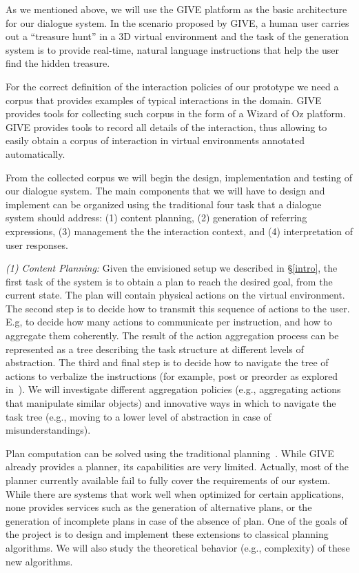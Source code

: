 As we mentioned above, we will use the GIVE platform as the basic architecture 
for our dialogue system.  In the scenario proposed by GIVE, a
human user carries out a ``treasure hunt'' in a 3D virtual environment
and the task of the generation system is to provide real-time, natural
language instructions that help the user find the hidden treasure.

For the correct definition of the interaction policies of our prototype we need
a corpus that provides examples of typical interactions in the domain. GIVE
provides tools for collecting such corpus in the form of a Wizard of Oz
platform. GIVE provides tools to record all details of the interaction, thus
allowing to easily obtain a corpus of interaction in virtual environments
annotated automatically.

From the collected corpus we will begin the design, implementation and testing
of our dialogue system.  The main components that we will have to design and 
implement can be organized using the traditional four task that a dialogue 
system should address: (1) content planning, (2)
generation of referring expressions, (3) management the the interaction context, and
(4) interpretation of user responses. 

\emph{(1) Content Planning:} Given the envisioned setup we described in \S\ref{intro},
the first task of the system is to obtain a plan to reach the desired goal, from the current state.
The plan will contain physical actions on the virtual environment. The second
step is to decide how to transmit this sequence of actions to the user. E.g, to decide
how many actions to communicate per instruction, and how to aggregate them
coherently. The result of the action aggregation process can be represented as a
tree describing the task structure at different levels of abstraction. The third
and final step is to decide how to navigate the tree of actions to verbalize the
instructions (for example, post or preorder as
explored in~\cite{foster-etal-ijcai2009}). We will investigate
different aggregation policies (e.g., aggregating actions that
manipulate similar objects) and innovative ways in which to navigate the task tree
(e.g., moving to a lower level of abstraction in case of misunderstandings).

Plan computation can be solved using the traditional planning~\cite{nau04}.
While GIVE already provides a planner, its capabilities are very limited. 
Actually, most of the planner currently available fail to fully cover 
the requirements of our system. While there are systems that work well 
when optimized for certain applications, none provides services such as the generation of alternative
plans, or the generation of incomplete plans in case of the absence of plan.
One of the goals of the project is to design and implement these extensions to 
classical planning algorithms. We will also study the theoretical behavior (e.g., complexity) of
these new algorithms. 

